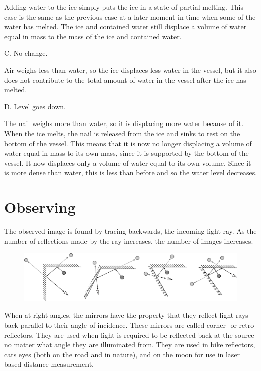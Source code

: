 Adding water to the ice simply puts the ice in a state of partial melting. This case is the same as the previous case at a later moment in time when some of the water has melted. The ice and contained water still displace a volume of water equal in mass to the mass of the ice and contained water.

C. No change.

Air weighs less than water, so the ice displaces less water in the vessel, but it also does not contribute to the total amount of water in the vessel after the ice has melted.

D. Level goes down.

The nail weighs more than water, so it is displacing more water because of it. When the ice melts, the nail is released from the ice and sinks to rest on the bottom of the vessel. This means that it is now no longer displacing a volume of water equal in mass to its own mass, since it is supported by the bottom of the vessel. It now displaces only a volume of water equal to its own volume. Since it is more dense than water, this is less than before and so the water level decreases.

\section{Observing}
The observed image is found by tracing backwards, the incoming light ray. As the number of reflections made by the ray increases, the number of images increases.
\begin{figure}[ht]
  \centering
  \includegraphics[width=1.0\textwidth]{mirrors_answer.pdf}
\end{figure}
When at right angles, the mirrors have the property that they reflect light rays back parallel to their angle of incidence. These mirrors are called corner- or retro-reflectors. They are used when light is required to be reflected back at the source no matter what angle they are illuminated from. They are used in bike reflectors, cats eyes (both on the road and in nature), and on the moon for use in laser based distance measurement.
